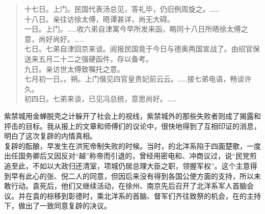 \begin{quote}
十七日。上门。民国代表汤总见，答礼毕，仍旧例周旋之。……\\

十八日。亲往访徐太傅，晤谭甚详，尚无大碍。\\

一日。上门。……收六弟自津寓今早所发来函，略同十八日所晤徐太傅之意，尚好尚好。……\\

七日。七弟自津回京来谈。阅报民国竟于今日与德奥两国宣战了。由绍官保送来五月二十二之强硬函件，存以备考。\\

九日。亲访世太傅致嘱托之意。\\

七月初一日。。朔。上门偕见四官皇贵妃前云云。……接七弟电语，畅谈许久。\\

初四日。七弟来谈，已见冯总统，意思尚好。……\\
\end{quote}

紫禁城用金蝉脱壳之计躲开了社会上的视线，紫禁城外的那些失败者则成了揭露和抨击的目标。我从报上的文章和师傅们的议论中，很快地得到了互相印证的消息，明白了这次复辟的内情真相。\\

复辟的酝酿，早发生在洪宪帝制失败的时候。当时，的北洋系陷于四面楚歌，一度出任国务卿后又因反对“越”称帝而引退的，曾经用密电和、冲商议过，说“民党煎追至此，不如以大政归还清室，项城仍居总理大臣之职，领握军权”。这个主意得到早有此心的张、倪二人的同意，但因后来没有得到各国公使方面的支持，所以未敢行动。袁死后，他们又继续活动，在徐州、南京先后召开了北洋系军人首脑会议。并在袁的棕移到彰德时，乘北洋系的首脑、督军们齐往致祭的机会，在的主持下，做出了一致同意复辟的决议。\\

